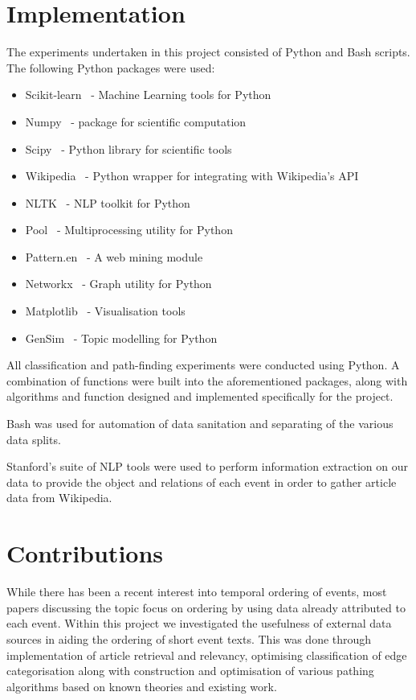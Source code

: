 \documentclass[bsc,frontabs,twoside,singlespacing,parskip,deptreport]{infthesis}     %
\begin{document}
\section{Implementation}
The experiments undertaken in this project consisted of Python and Bash scripts.
The following Python packages were used:
\begin{itemize}
\item Scikit-learn~\cite{scikit-learn} - Machine Learning tools for Python
\item Numpy~\cite{numpy} - package for scientific computation
\item Scipy~\cite{scipy} - Python library for scientific tools
\item Wikipedia~\cite{wikipediaAPI} - Python wrapper for integrating with Wikipedia's API
\item NLTK~\cite{nltk} - NLP toolkit for Python
\item Pool~\cite{pool} - Multiprocessing utility for Python
\item Pattern.en~\cite{pattern} - A web mining module 
\item Networkx~\cite{networkx} - Graph utility for Python
\item Matplotlib~\cite{matplotlib} - Visualisation tools
\item GenSim~\cite{rehurek_lrec} - Topic modelling for Python 
\end{itemize}
All classification and path-finding experiments were conducted using Python. A combination of
functions were built into the aforementioned packages, along with algorithms and function designed and implemented
specifically for the project.

Bash was used for automation of data sanitation and separating of the various data splits. 

Stanford's suite of NLP tools were used to perform information extraction on our data to provide the
object and relations of each event in order to gather article data from Wikipedia.
\section{Contributions}
While there has been a recent interest into temporal ordering of events, most papers discussing the topic focus on
ordering by using data already attributed to each event. Within this project we investigated the usefulness of
external data sources in aiding the ordering of short event texts. This was done through implementation
of article retrieval and relevancy, optimising classification of edge categorisation along with construction and optimisation
of various pathing algorithms based on known theories and existing work. 
\end{document}
